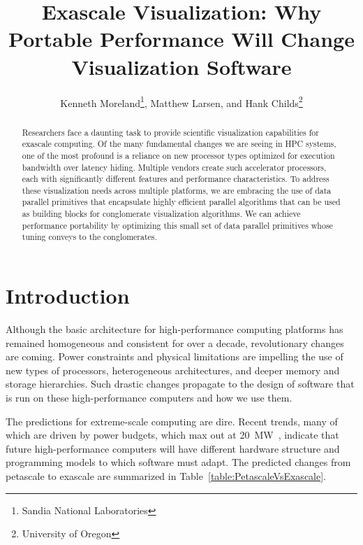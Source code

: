 \documentclass{superfri}
\newcommand*{\lcite}[1]{~\cite{#1}}
\begin{document}
\author{
  Kenneth Moreland\footnote{Sandia National Laboratories},
  Matthew Larsen, and
  Hank Childs\footnote{\label{ou}University of Oregon}
  }

\title{Exascale Visualization: Why Portable Performance Will Change Visualization Software}

\maketitle{}

\begin{abstract}%
  \noindent
  Researchers face a daunting task to provide scientific visualization
  capabilities for exascale computing. Of the many fundamental changes we
  are seeing in HPC systems, one of the most profound is a reliance on new
  processor types optimized for execution bandwidth over latency hiding.
  Multiple vendors create such accelerator processors, each with
  significantly different features and performance characteristics. To
  address these visualization needs across multiple platforms, we are
  embracing the use of data parallel primitives that encapsulate highly
  efficient parallel algorithms that can be used as building blocks for
  conglomerate visualization algorithms. We can achieve performance
  portability by optimizing this small set of data parallel primitives
  whose tuning conveys to the conglomerates.

\end{abstract}


\section*{Introduction}
\label{sec:Introduction}

\noindent
Although the basic architecture for high-performance computing platforms has
remained homogeneous and consistent for over a decade, revolutionary changes
are coming. Power constraints and physical limitations are impelling the
use of new types of processors, heterogeneous architectures, and deeper
memory and storage hierarchies. Such drastic changes propagate to the
design of software that is run on these high-performance computers and how
we use them.

The predictions for extreme-scale computing are dire.  Recent trends, many
of which are driven by power budgets, which max out at
20~MW\lcite{ExascaleArchitecturesReport}, indicate that future
high-performance computers will have different hardware structure and
programming models to which software must adapt. The predicted changes from
petascale to exascale are summarized in
Table~\ref{table:PetascaleVsExascale}.
\end{document}
